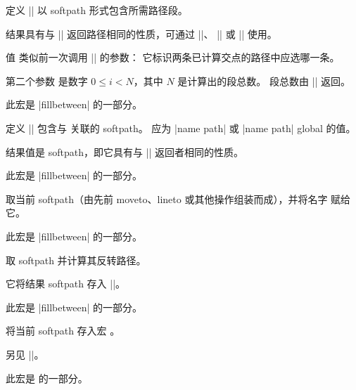 \begin{command}{\pgfgetintersectionsegmentpath{}}
    定义 |\pgfretval| 以 softpath 形式包含所需路径段。

    结果具有与 |\pgfgetpath| 返回路径相同的性质，可通过 |\pgfsetpath|、
    |\pgfsetpathandBB| 或 |\pgfaddpathandBB| 使用。

    值  类似前一次调用 |\pgfcomputeintersectionsegments| 的参数：
    它标识两条已计算交点的路径中应选哪一条。

    第二个参数  是数字 $0 \le i < N$，其中 $N$ 是计算出的段总数。
    段总数由 |\pgfcomputeintersectionsegments| 返回。

    此宏是 |fillbetween| 的一部分。
\end{command}

\begin{command}{\tikzgetnamedpath{}}
    定义 |\pgfretval| 包含与  关联的 softpath。
     应为 |name path| 或 |name path| global 的值。

    结果值是 softpath，即它具有与 |\pgfgetpath| 返回者相同的性质。

    此宏是 |fillbetween| 的一部分。
\end{command}

\begin{command}{\tikznamecurrentpath{}}
    取当前 softpath（由先前 moveto、lineto 或其他操作组装而成），并将名字
     赋给它。

    此宏是 |fillbetween| 的一部分。
\end{command}

\begin{command}{\pgfcomputereversepath{}}
    取 softpath  并计算其反转路径。

    它将结果 softpath 存入 |\pgfretval|。

    此宏是 |fillbetween| 的一部分。
\end{command}

\begin{command}{\pgfgetpath{}}
    将当前 softpath 存入宏 。

    另见 |\tikzgetnamedpath|。

    此宏是 \pgfname{} 的一部分。
\end{command}

